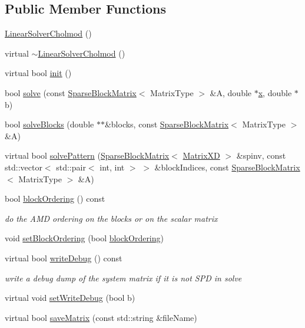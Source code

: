 \subsection*{Public Member Functions}
\begin{DoxyCompactItemize}
\item 
\hyperlink{classg2o_1_1LinearSolverCholmod_a7137027913fef850037d07a11c0cc1b2}{Linear\+Solver\+Cholmod} ()
\item 
virtual \hyperlink{classg2o_1_1LinearSolverCholmod_a6a75af51fa7a46e1ee8906582e311fff}{$\sim$\+Linear\+Solver\+Cholmod} ()
\item 
virtual bool \hyperlink{classg2o_1_1LinearSolverCholmod_ad3957b891cebac9e0c7f821db84156b1}{init} ()
\item 
bool \hyperlink{classg2o_1_1LinearSolverCholmod_a86c8fcb2b24961139e14d57ce1b93805}{solve} (const \hyperlink{classg2o_1_1SparseBlockMatrix}{Sparse\+Block\+Matrix}$<$ Matrix\+Type $>$ \&A, double $\ast$\hyperlink{sparse__helper_8cpp_af88b946fb90d5f08b5fb740c70e98c10}{x}, double $\ast$b)
\item 
bool \hyperlink{classg2o_1_1LinearSolverCholmod_aa329db9e0146831f0f07eef1ddd91c91}{solve\+Blocks} (double $\ast$$\ast$\&blocks, const \hyperlink{classg2o_1_1SparseBlockMatrix}{Sparse\+Block\+Matrix}$<$ Matrix\+Type $>$ \&A)
\item 
virtual bool \hyperlink{classg2o_1_1LinearSolverCholmod_a26b03e93525b164b7842cc8b2f0ad000}{solve\+Pattern} (\hyperlink{classg2o_1_1SparseBlockMatrix}{Sparse\+Block\+Matrix}$<$ \hyperlink{namespaceg2o_a8a808fe01b0b4e0afe637fe680853d0a}{Matrix\+XD} $>$ \&spinv, const std\+::vector$<$ std\+::pair$<$ int, int $>$ $>$ \&block\+Indices, const \hyperlink{classg2o_1_1SparseBlockMatrix}{Sparse\+Block\+Matrix}$<$ Matrix\+Type $>$ \&A)
\item 
bool \hyperlink{classg2o_1_1LinearSolverCholmod_a52b390fe9979ee9f2d3130775f550c9b}{block\+Ordering} () const 
\begin{DoxyCompactList}\small\item\em do the A\+MD ordering on the blocks or on the scalar matrix \end{DoxyCompactList}\item 
void \hyperlink{classg2o_1_1LinearSolverCholmod_a7095e7086f148f0c3bf18073bd47488a}{set\+Block\+Ordering} (bool \hyperlink{classg2o_1_1LinearSolverCholmod_a52b390fe9979ee9f2d3130775f550c9b}{block\+Ordering})
\item 
virtual bool \hyperlink{classg2o_1_1LinearSolverCholmod_a84ac87445e40dc2af7fd78dda84eaf8d}{write\+Debug} () const 
\begin{DoxyCompactList}\small\item\em write a debug dump of the system matrix if it is not S\+PD in solve \end{DoxyCompactList}\item 
virtual void \hyperlink{classg2o_1_1LinearSolverCholmod_a2fdd3d8f3fd88a50b836ee4730cde6e2}{set\+Write\+Debug} (bool b)
\item 
virtual bool \hyperlink{classg2o_1_1LinearSolverCholmod_a93f03e43f45ed73cc2becd4c8d77f5f4}{save\+Matrix} (const std\+::string \&file\+Name)
\end{DoxyCompactItemize}
